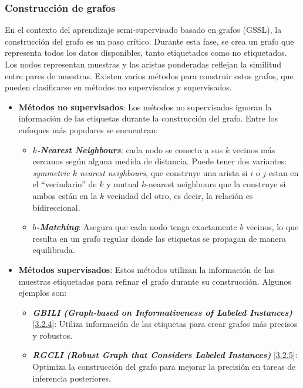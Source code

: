 \subsubsection{Construcción de grafos}
En el contexto del aprendizaje semi-supervisado basado en grafos (GSSL), la construcción del grafo es un paso crítico. Durante esta fase, se crea un grafo que representa todos los datos disponibles, tanto etiquetados como no etiquetados. Los nodos representan muestras y las aristas ponderadas reflejan la similitud entre pares de muestras. Existen varios métodos para construir estos grafos, que pueden clasificarse en métodos no supervisados y supervisados.
\begin{itemize}
	\item \textbf{Métodos no supervisados}: Los métodos no supervisados ignoran la información de las etiquetas durante la construcción del grafo. Entre los enfoques más populares se encuentran:
	\begin{itemize}
		\item \textbf{\textit{$k$-Nearest Neighbours}}: cada nodo se conecta a sus $k$ vecinos más cercanos según alguna medida de distancia. Puede tener dos variantes: \textit{symmetric $k$ nearest neighbours}, que construye una arista si $i$ o $j$ estan en el ``vecindario'' de $k$ y mutual $k$-nearest neighbours que la construye si ambos están en la $k$ vecindad del otro, es decir, la relación es bidireccional.
		\item \textbf{\textit{$b$-Matching}}: Asegura que cada nodo tenga exactamente $b$ vecinos, lo que resulta en un grafo regular donde las etiquetas se propagan de manera equilibrada.
	\end{itemize}
	\item \textbf{Métodos supervisados}: Estos métodos utilizan la información de las muestras etiquetadas para refinar el grafo durante su construcción. Algunos ejemplos son:
	\begin{itemize}
		\item \textbf{\textit{GBILI (Graph-based on Informativeness of Labeled Instances)}} [\hyperref[sec3:gbili]{3.2.4}]: Utiliza información de las etiquetas para crear grafos más precisos y robustos.
		\item \textbf{\textit{RGCLI (Robust Graph that Considers Labeled Instances)}} [\hyperref[sec3:rgcli]{3.2.5}]: Optimiza la construcción del grafo para mejorar la precisión en tareas de inferencia posteriores.
	\end{itemize}
\end{itemize}


